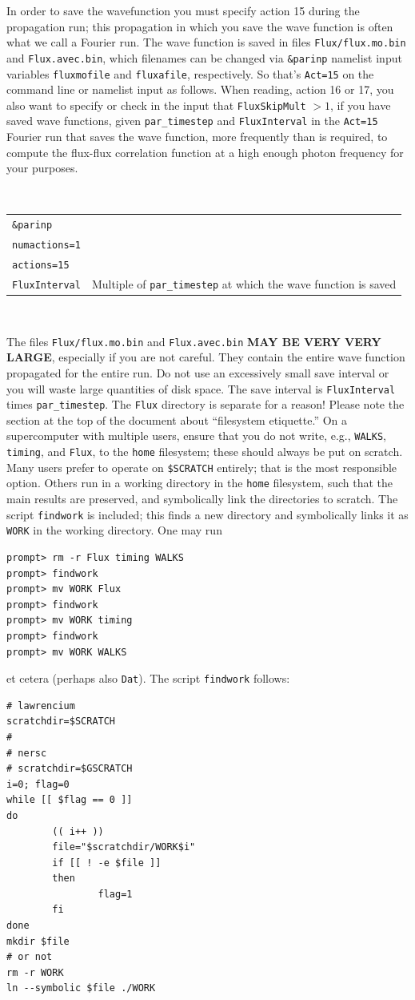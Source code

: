 \documentclass[10pt,leqno, oneside]{book}
\begin{document}
In order to save the wavefunction you must specify action 15 during the propagation run; this propagation in which 
you save the wave function is often
what we call a Fourier run.  The wave function is saved in files \verb#Flux/flux.mo.bin# and 
\verb#Flux.avec.bin#, which filenames can be changed via \verb#&parinp# namelist input variables \verb#fluxmofile# and \verb#fluxafile#, respectively.
%
So that's \verb#Act=15# on the command line
or namelist input as follows.  When reading, action 16 or 17, you also want to specify or check in the input that \verb#FluxSkipMult# $>1$, if you have saved 
wave functions, given \verb#par_timestep# and \verb#FluxInterval# in the \verb#Act=15# Fourier run that saves the wave function, more frequently
than is required, to compute the flux-flux correlation function at a high enough photon frequency for your purposes.

\

{\footnotesize
\begin{tabular}{ll}
\verb#&parinp# & \\
\verb#numactions=1# & \\
\verb#actions=15# & \\
\verb#FluxInterval# & Multiple of \verb#par_timestep# at which the wave function is saved \\
\end{tabular}}

\

The files \verb#Flux/flux.mo.bin# and 
\verb#Flux.avec.bin#
%
\textbf{MAY BE VERY VERY LARGE}, especially if you are not careful.
They contain the entire wave function propagated for the entire run.  Do not use an excessively
small save interval or you will waste large quantities of disk space.  The save interval is \verb#FluxInterval# times \verb#par_timestep#.  The \verb#Flux# directory
is separate for a reason!  Please note the section at the top of the document about ``filesystem etiquette.''  On a supercomputer with multiple users, ensure that
you do not write, e.g., \verb#WALKS#, \verb#timing#, and \verb#Flux#, to the \verb#home# filesystem; these should always be put on scratch.  Many users
prefer to operate on \verb#$SCRATCH# entirely; that is the most responsible option.  Others run in a working directory in the \verb#home# filesystem, such
that the main results are preserved, and symbolically link the directories to scratch.  The script \verb#findwork# is included; this finds a new directory and symbolically
links it as \verb#WORK# in the working directory.  One may run
{\footnotesize
\begin{verbatim}
prompt> rm -r Flux timing WALKS
prompt> findwork
prompt> mv WORK Flux
prompt> findwork
prompt> mv WORK timing
prompt> findwork
prompt> mv WORK WALKS
\end{verbatim}}
et cetera (perhaps also \verb#Dat#).  The script \verb#findwork# follows:
{\footnotesize
\begin{verbatim}
# lawrencium
scratchdir=$SCRATCH
#
# nersc
# scratchdir=$GSCRATCH
i=0; flag=0
while [[ $flag == 0 ]]
do
        (( i++ ))
        file="$scratchdir/WORK$i"
        if [[ ! -e $file ]]
        then
                flag=1
        fi
done
mkdir $file
# or not
rm -r WORK
ln --symbolic $file ./WORK
\end{verbatim}}
\end{document}
